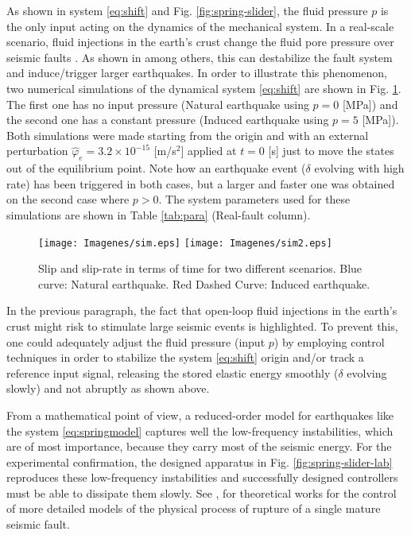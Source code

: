\documentclass[journal,twoside,web]{ieeecolor}
\begin{document}
As shown in system \eqref{eq:shift} and Fig. \ref{fig:spring-slider}, the fluid pressure $p$ is the only input acting on the dynamics of the mechanical system. In a real-scale scenario, fluid injections in the earth's crust change the fluid pore pressure over seismic faults \cite{b:Cappa-Scuderi-Collettini-Guglielmi-Avouac}. As shown in \cite{b:Tzortzopoulos-Braun-Stefanou-2021} among others, this can destabilize the fault system and induce/trigger larger earthquakes. In order to illustrate this phenomenon, two numerical simulations of the dynamical system \eqref{eq:shift} are shown in Fig. \ref{fig:sim}. The first one has no input pressure (Natural earthquake using $p=0$ [MPa]) and the second one has a constant pressure (Induced earthquake using $p=5$ [MPa]). Both simulations were made starting from the origin and with an external perturbation $\hat{\varphi}_e=3.2\times 10^{-15}$ [m/s$^2$] applied at $t=0$ [s] just to move the states out of the equilibrium point. Note how an earthquake event ($\delta$ evolving with high rate) has been triggered in both cases, but a larger and faster one was obtained on the second case where $p>0$. The system parameters used for these simulations are shown in Table \ref{tab:para} (Real-fault column).

\begin{figure}[ht!]
  \centering 
  \texttt{[image: Imagenes/sim.eps]}
  \texttt{[image: Imagenes/sim2.eps]}
  \caption{Slip and slip-rate in terms of time for two different scenarios. Blue curve: Natural earthquake. Red Dashed Curve: Induced earthquake.}
  \label{fig:sim}
\end{figure}

In the previous paragraph, the fact that open-loop fluid injections in the earth's crust might risk to stimulate large seismic events is highlighted. To prevent this, one could adequately adjust the fluid pressure (input $p$) by employing control techniques in order to stabilize the system \eqref{eq:shift} origin and/or track a reference input signal, releasing the stored elastic energy smoothly ($\delta$ evolving slowly) and not abruptly as shown above. %

From a mathematical point of view, a reduced-order model for earthquakes like the system \eqref{eq:springmodel} captures well the low-frequency instabilities, which are of most importance, because they carry most of the seismic energy. For the experimental confirmation, the designed apparatus in Fig. \ref{fig:spring-slider-lab} reproduces these low-frequency instabilities and successfully designed controllers must be able to dissipate them slowly. See \cite{b:https://doi.org/10.1029/2021JB023410,b:Gutierrez-Stefanou-Plestan-2022}, for theoretical works for the control of more detailed models of the physical process of rupture of a single mature seismic fault. 
\end{document}
